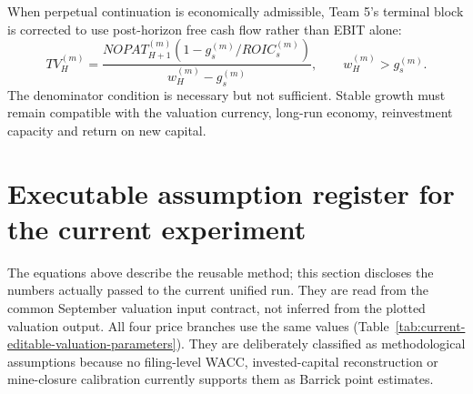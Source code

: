 When perpetual continuation is economically admissible, Team 5's terminal
block is corrected to use post-horizon free cash flow rather than EBIT alone:
\begin{equation}
TV_H^{(m)}=
\frac{NOPAT_{H+1}^{(m)}
\left(1-g_s^{(m)}/ROIC_s^{(m)}\right)}
{w_H^{(m)}-g_s^{(m)}},
\qquad w_H^{(m)}>g_s^{(m)}.
\end{equation}
The denominator condition is necessary but not sufficient. Stable growth must
remain compatible with the valuation currency, long-run economy, reinvestment
capacity and return on new capital.

\section{Executable assumption register for the current experiment}
\label{sec:executable-valuation-assumptions}

The equations above describe the reusable method; this section discloses the
numbers actually passed to the current unified run. They are read from
the common September valuation input contract, not inferred
from the plotted valuation output. All four price branches use the same values
(Table~\ref{tab:current-editable-valuation-parameters}).
They are deliberately classified as methodological assumptions because no
filing-level WACC, invested-capital reconstruction or mine-closure calibration
currently supports them as Barrick point estimates.

